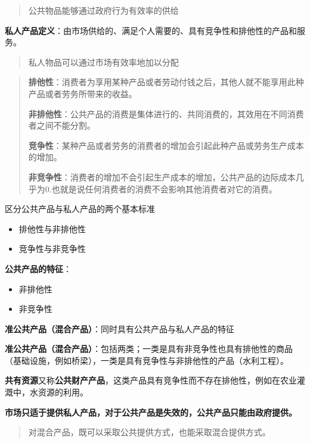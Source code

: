\documentclass[
]{book}
\providecommand{\tightlist}{%
  \setlength{\itemsep}{0pt}\setlength{\parskip}{0pt}}
\begin{document}
\begin{quote}
公共物品能够通过政府行为有效率的供给
\end{quote}

\textbf{私人产品定义}：由市场供给的、满足个人需要的、具有竞争性和排他性的产品和服务。

\begin{quote}
私人物品可以通过市场有效率地加以分配
\end{quote}

\begin{quote}
\textbf{排他性}：消费者为享用某种产品或者劳动付钱之后，其他人就不能享用此种产品或者劳务所带来的收益。

\textbf{非排他性}：公共产品的消费是集体进行的、共同消费的，其效用在不同消费者之间不能分割。

\textbf{竞争性}：某种产品或者劳务的消费者的增加会引起此种产品或劳务生产成本的增加。

\textbf{非竞争性}：消费者的增加不会引起生产成本的增加，公共产品的边际成本几乎为0.也就是说任何消费者的消费不会影响其他消费者对它的消费。
\end{quote}

区分公共产品与私人产品的两个基本标准

\begin{itemize}
\tightlist
\item
  排他性与非排他性
\item
  竞争性与非竞争性
\end{itemize}

\textbf{公共产品的特征}：

\begin{itemize}
\tightlist
\item
  非排他性
\item
  非竞争性
\end{itemize}

\textbf{准公共产品（混合产品）}：同时具有公共产品与私人产品的特征

\textbf{准公共产品（混合产品）}：包括两类；一类是具有非竞争性也具有排他性的商品（基础设施，例如桥梁），一类是具有竞争性与非排他性的产品（水利工程）。

\textbf{共有资源}又称\textbf{公共财产产品}，这类产品具有竞争性而不存在排他性，例如在农业灌溉中，水资源的利用。

\textbf{市场只适于提供私人产品，对于公共产品是失效的，公共产品只能由政府提供。}

\begin{quote}
对混合产品，既可以采取公共提供方式，也能采取混合提供方式。
\end{quote}
\end{document}
